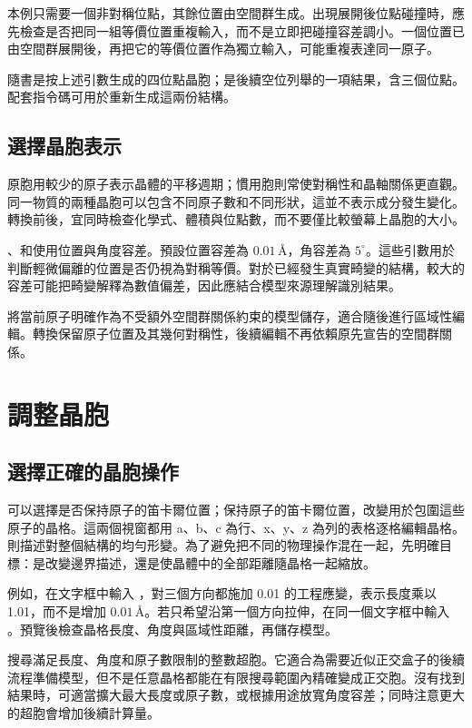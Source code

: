 本例只需要一個非對稱位點，其餘位置由空間群生成。出現展開後位點碰撞時，應先檢查是否把同一組等價位置重複輸入，而不是立即把碰撞容差調小。一個位置已由空間群展開後，再把它的等價位置作為獨立輸入，可能重複表達同一原子。

隨書是按上述引數生成的四位點晶胞；是後續空位列舉的一項結果，含三個位點。配套指令碼可用於重新生成這兩份結構。

\subsection{選擇晶胞表示}

原胞用較少的原子表示晶體的平移週期；慣用胞則常使對稱性和晶軸關係更直觀。同一物質的兩種晶胞可以包含不同原子數和不同形狀，這並不表示成分發生變化。轉換前後，宜同時檢查化學式、體積與位點數，而不要僅比較螢幕上晶胞的大小。

、和使用位置與角度容差。預設位置容差為 $0.01\,\text{\AA}$，角容差為 $5^\circ$。這些引數用於判斷輕微偏離的位置是否仍視為對稱等價。對於已經發生真實畸變的結構，較大的容差可能把畸變解釋為數值偏差，因此應結合模型來源理解識別結果。

將當前原子明確作為不受額外空間群關係約束的模型儲存，適合隨後進行區域性編輯。轉換保留原子位置及其幾何對稱性，後續編輯不再依賴原先宣告的空間群關係。

\section{調整晶胞}

\subsection{選擇正確的晶胞操作}

可以選擇是否保持原子的笛卡爾位置；保持原子的笛卡爾位置，改變用於包圍這些原子的晶格。這兩個視窗都用 a、b、c 為行、x、y、z 為列的表格逐格編輯晶格。則描述對整個結構的均勻形變。為了避免把不同的物理操作混在一起，先明確目標：是改變邊界描述，還是使晶體中的全部距離隨晶格一起縮放。

例如，在文字框中輸入 ，對三個方向都施加 0.01 的工程應變，表示長度乘以 1.01，而不是增加 $0.01\,\text{\AA}$。若只希望沿第一個方向拉伸，在同一個文字框中輸入 。預覽後檢查晶格長度、角度與區域性距離，再儲存模型。

搜尋滿足長度、角度和原子數限制的整數超胞。它適合為需要近似正交盒子的後續流程準備模型，但不是任意晶格都能在有限搜尋範圍內精確變成正交胞。沒有找到結果時，可適當擴大最大長度或原子數，或根據用途放寬角度容差；同時注意更大的超胞會增加後續計算量。

